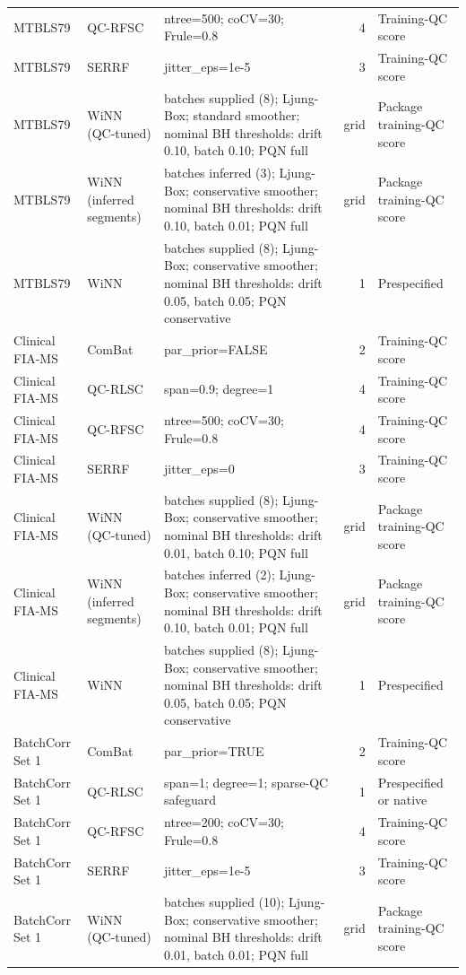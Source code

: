\begin{landscape}
\begin{longtable}{p{2.6cm}p{3.4cm}p{9.6cm}rp{3.6cm}}
MTBLS79 & QC-RFSC & ntree=500; coCV=30; Frule=0.8 & 4 & Training-QC score \\
MTBLS79 & SERRF & jitter\_eps=1e-5 & 3 & Training-QC score \\
MTBLS79 & WiNN (QC-tuned) & batches supplied (8); Ljung-Box; standard smoother; nominal BH thresholds: drift 0.10, batch 0.10; PQN full & grid & Package training-QC score \\
MTBLS79 & WiNN (inferred segments) & batches inferred (3); Ljung-Box; conservative smoother; nominal BH thresholds: drift 0.10, batch 0.01; PQN full & grid & Package training-QC score \\
MTBLS79 & WiNN & batches supplied (8); Ljung-Box; conservative smoother; nominal BH thresholds: drift 0.05, batch 0.05; PQN conservative & 1 & Prespecified \\
\midrule
Clinical FIA-MS & ComBat & par\_prior=FALSE & 2 & Training-QC score \\
Clinical FIA-MS & QC-RLSC & span=0.9; degree=1 & 4 & Training-QC score \\
Clinical FIA-MS & QC-RFSC & ntree=500; coCV=30; Frule=0.8 & 4 & Training-QC score \\
Clinical FIA-MS & SERRF & jitter\_eps=0 & 3 & Training-QC score \\
Clinical FIA-MS & WiNN (QC-tuned) & batches supplied (8); Ljung-Box; conservative smoother; nominal BH thresholds: drift 0.01, batch 0.10; PQN full & grid & Package training-QC score \\
Clinical FIA-MS & WiNN (inferred segments) & batches inferred (2); Ljung-Box; conservative smoother; nominal BH thresholds: drift 0.10, batch 0.01; PQN full & grid & Package training-QC score \\
Clinical FIA-MS & WiNN & batches supplied (8); Ljung-Box; conservative smoother; nominal BH thresholds: drift 0.05, batch 0.05; PQN conservative & 1 & Prespecified \\
\midrule
BatchCorr Set 1 & ComBat & par\_prior=TRUE & 2 & Training-QC score \\
BatchCorr Set 1 & QC-RLSC & span=1; degree=1; sparse-QC safeguard & 1 & Prespecified or native \\
BatchCorr Set 1 & QC-RFSC & ntree=200; coCV=30; Frule=0.8 & 4 & Training-QC score \\
BatchCorr Set 1 & SERRF & jitter\_eps=1e-5 & 3 & Training-QC score \\
BatchCorr Set 1 & WiNN (QC-tuned) & batches supplied (10); Ljung-Box; conservative smoother; nominal BH thresholds: drift 0.01, batch 0.01; PQN full & grid & Package training-QC score \\

\end{longtable}
\end{landscape}
